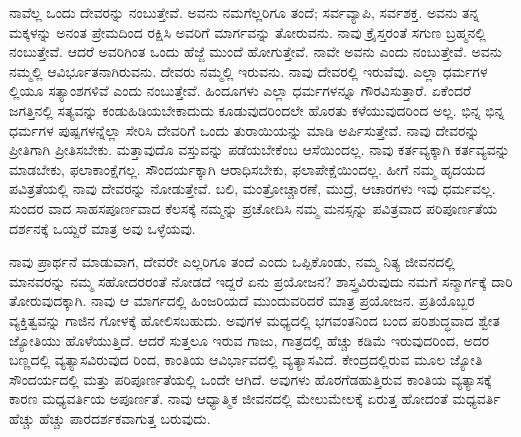 ನಾವೆಲ್ಲ ಒಂದು ದೇವರನ್ನು ನಂಬುತ್ತೇವೆ. ಅವನು ನಮಗೆಲ್ಲರಿಗೂ ತಂದೆ; ಸರ್ವವ್ಯಾಪಿ, ಸರ್ವಶಕ್ತ. ಅವನು ತನ್ನ ಮಕ್ಕಳನ್ನು ಅನಂತ ಪ್ರೇಮದಿಂದ ರಕ್ಷಿಸಿ ಅವರಿಗೆ ಮಾರ್ಗವನ್ನು ತೋರುವನು. ನಾವು ಕ್ರೈಸ್ತರಂತೆ ಸಗುಣ ಬ್ರಹ್ಮನಲ್ಲಿ ನಂಬುತ್ತೇವೆ. ಆದರೆ ಅವರಿಗಿಂತ ಒಂದು ಹೆಜ್ಜೆ ಮುಂದೆ ಹೋಗುತ್ತೇವೆ. ನಾವೇ ಅವನು ಎಂದು ನಂಬುತ್ತೇವೆ. ಅವನು ನಮ್ಮಲ್ಲಿ ಆವಿರ್ಭೂತನಾಗಿರುವನು. ದೇವರು ನಮ್ಮಲ್ಲಿ ಇರುವನು. ನಾವು ದೇವರಲ್ಲಿ ಇರುವೆವು. ಎಲ್ಲಾ ಧರ್ಮಗಳ ಲ್ಲಿಯೂ ಸತ್ಯಾಂಶಗಳಿವೆ ಎಂದು ನಂಬುತ್ತೇವೆ. ಹಿಂದೂಗಳು ಎಲ್ಲಾ ಧರ್ಮಗಳನ್ನೂ ಗೌರವಿಸುತ್ತಾರೆ. ಏಕೆಂದರೆ ಜಗತ್ತಿನಲ್ಲಿ ಸತ್ಯವನ್ನು ಕಂಡುಹಿಡಿಯಬೇಕಾದುದು ಕೂಡುವುದರಿಂದಲೇ ಹೊರತು ಕಳೆಯುವುದರಿಂದ ಅಲ್ಲ. ಭಿನ್ನ ಭಿನ್ನ ಧರ್ಮಗಳ ಪುಷ್ಪಗಳನ್ನೆಲ್ಲಾ ಸೇರಿಸಿ ದೇವರಿಗೆ ಒಂದು ತುರಾಯಿಯನ್ನು ಮಾಡಿ ಅರ್ಪಿಸುತ್ತೇವೆ. ನಾವು ದೇವರನ್ನು ಪ್ರೀತಿಗಾಗಿ ಪ್ರೀತಿಸಬೇಕು. ಮತ್ತಾವುದೊ ವಸ್ತುವನ್ನು ಪಡೆಯಬೇಕೆಂಬ ಆಸೆಯಿಂದಲ್ಲ. ನಾವು ಕರ್ತವ್ಯಕ್ಕಾಗಿ ಕರ್ತವ್ಯವನ್ನು ಮಾಡಬೇಕು, ಫಲಾಕಾಂಕ್ಷೆಗಲ್ಲ. ಸೌಂದರ್ಯಕ್ಕಾಗಿ ಆರಾಧಿಸಬೇಕು, ಫಲಾಪೇಕ್ಷೆಯಿಂದಲ್ಲ. ಹೀಗೆ ನಮ್ಮ ಹೃದಯದ ಪವಿತ್ರತೆಯಲ್ಲಿ ನಾವು ದೇವರನ್ನು ನೋಡುತ್ತೇವೆ. ಬಲಿ, ಮಂತ್ರೋಚ್ಚಾರಣೆ, ಮುದ್ರೆ, ಆಚಾರಗಳು ಇವು ಧರ್ಮವಲ್ಲ. ಸುಂದರ ವಾದ ಸಾಹಸಪೂರ್ಣವಾದ ಕೆಲಸಕ್ಕೆ ನಮ್ಮನ್ನು ಪ್ರಚೋದಿಸಿ ನಮ್ಮ ಮನಸ್ಸನ್ನು ಪವಿತ್ರವಾದ ಪರಿಪೂರ್ಣತೆಯ ದರ್ಶನಕ್ಕೆ ಒಯ್ದರೆ ಮಾತ್ರ ಅವು ಒಳ್ಳೆಯವು.

ನಾವು ಪ್ರಾರ್ಥನೆ ಮಾಡುವಾಗ, ದೇವರೇ ಎಲ್ಲರಿಗೂ ತಂದೆ ಎಂದು ಒಪ್ಪಿಕೊಂಡು, ನಮ್ಮ ನಿತ್ಯ ಜೀವನದಲ್ಲಿ ಮಾನವರನ್ನು ನಮ್ಮ ಸಹೋದರರಂತೆ ನೋಡದೆ ಇದ್ದರೆ ಏನು ಪ್ರಯೋಜನ? ಶಾಸ್ತ್ರವಿರುವುದು ನಮಗೆ ಸನ್ಮಾರ್ಗಕ್ಕೆ ದಾರಿ ತೋರುವುದಕ್ಕಾಗಿ. ನಾವು ಆ ಮಾರ್ಗದಲ್ಲಿ ಹಿಂಜರಿಯದೆ ಮುಂದುವರಿದರೆ ಮಾತ್ರ ಪ್ರಯೋಜನ. ಪ್ರತಿಯೊಬ್ಬರ ವ್ಯಕ್ತಿತ್ವವನ್ನು ಗಾಜಿನ ಗೋಳಕ್ಕೆ ಹೋಲಿಸಬಹುದು. ಅವುಗಳ ಮಧ್ಯದಲ್ಲಿ ಭಗವಂತನಿಂದ ಬಂದ ಪರಿಶುದ್ಧವಾದ ಶ್ವೇತ ಜ್ಯೋತಿಯು ಹೊಳೆಯುತ್ತಿದೆ. ಆದರೆ ಸುತ್ತಲೂ ಇರುವ ಗಾಜು, ಗಾತ್ರದಲ್ಲಿ ಹೆಚ್ಚು ಕಡಿಮೆ ಇರುವುದರಿಂದ, ಅದರ ಬಣ್ಣದಲ್ಲಿ ವ್ಯತ್ಯಾಸವಿರುವುದ ರಿಂದ, ಕಾಂತಿಯ ಆವಿರ್ಭಾವದಲ್ಲಿ ವ್ಯತ್ಯಾಸವಿದೆ. ಕೇಂದ್ರದಲ್ಲಿರುವ ಮೂಲ ಜ್ಯೋತಿ ಸೌಂದರ್ಯದಲ್ಲಿ ಮತ್ತು ಪರಿಪೂರ್ಣತೆಯಲ್ಲಿ ಒಂದೇ ಆಗಿದೆ. ಅವುಗಳು ಹೊರಗೆಡಹುತ್ತಿರುವ ಕಾಂತಿಯ ವ್ಯತ್ಯಾಸಕ್ಕೆ ಕಾರಣ ಮಧ್ಯವರ್ತಿಯ ಅಪೂರ್ಣತೆ. ನಾವು ಆಧ್ಯಾತ್ಮಿಕ ಜೀವನದಲ್ಲಿ ಮೇಲುಮೇಲಕ್ಕೆ ಏರುತ್ತ ಹೋದಂತೆ ಮಧ್ಯವರ್ತಿ ಹೆಚ್ಚು ಹೆಚ್ಚು ಪಾರದರ್ಶಕವಾಗುತ್ತ ಬರುವುದು.

